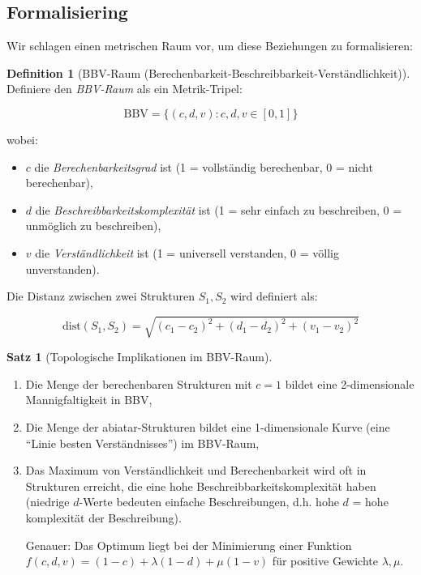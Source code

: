 \documentclass[a4paper,12pt]{article}
\theoremstyle{definition}
\newtheorem{definition}{Definition}
\newtheorem{satz}{Satz}
\begin{document}
\subsection{Formalisiering}

Wir schlagen einen metrischen Raum vor, um diese Beziehungen zu formalisieren:

\begin{definition}[BBV-Raum (Berechenbarkeit-Beschreibbarkeit-Verständlichkeit)]
Definiere den \textit{BBV-Raum} als ein Metrik-Tripel:

$$\text{BBV} = \{(c, d, v) : c, d, v \in [0,1]\}$$

wobei:
\begin{itemize}
\item $c$ die \textit{Berechenbarkeitsgrad} ist (1 = vollständig berechenbar, 0 = nicht berechenbar),
\item $d$ die \textit{Beschreibbarkeitskomplexität} ist (1 = sehr einfach zu beschreiben, 0 = unmöglich zu beschreiben),
\item $v$ die \textit{Verständlichkeit} ist (1 = universell verstanden, 0 = völlig unverstanden).
\end{itemize}

Die Distanz zwischen zwei Strukturen $S_1, S_2$ wird definiert als:

$$\text{dist}(S_1, S_2) = \sqrt{(c_1 - c_2)^2 + (d_1 - d_2)^2 + (v_1 - v_2)^2}$$
\end{definition}

\begin{satz}[Topologische Implikationen im BBV-Raum]
\begin{enumerate}
\item Die Menge der berechenbaren Strukturen mit $c = 1$ bildet eine 2-dimensionale Mannigfaltigkeit in BBV,
\item Die Menge der abiatar-Strukturen bildet eine 1-dimensionale Kurve (eine ``Linie besten Verständnisses'') im BBV-Raum,
\item Das Maximum von Verständlichkeit und Berechenbarkeit wird oft in Strukturen erreicht, die eine hohe Beschreibbarkeitskomplexität haben (niedrige $d$-Werte bedeuten einfache Beschreibungen, d.h. hohe $d$ = hohe komplexität der Beschreibung).

Genauer: Das Optimum liegt bei der Minimierung einer Funktion $f(c,d,v) = (1-c) + \lambda(1-d) + \mu(1-v)$ für positive Gewichte $\lambda, \mu$.
\end{enumerate}
\end{satz}
\end{document}

